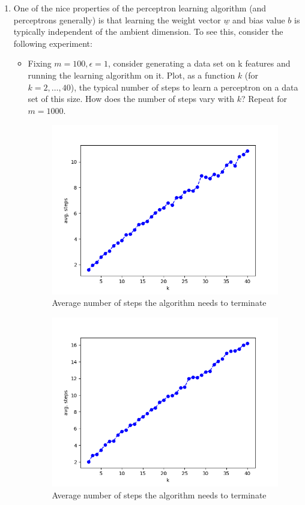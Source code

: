 \documentclass[letter, 12pt]{article}
\begin{document}
\begin{enumerate}
        
        \item {One of the nice properties of the perceptron learning algorithm (and perceptrons generally) is that learning
            the weight vector $ \underline{w} $ and bias value $ b $ is typically independent of the ambient dimension. To see this, consider
            the following experiment:}
        \begin{itemize}
            \item {Fixing $ m = 100, \epsilon = 1 $, consider generating a data set on k features and running the learning algorithm on
                it. Plot, as a function $ k $ (for $ k = 2, \dots , 40 $), the typical number of steps to learn a perceptron on a data
                set of this size. How does the number of steps vary with $ k $? Repeat for $ m = 1000 $.}
            \begin{figure}[H]
	            \centering
	            \includegraphics[width=.7\textwidth]{q4-100.png}
	            \caption{Average number of steps the algorithm needs to terminate}
        	\end{figure}
	        \begin{figure}[H]
		        \centering
		        \includegraphics[width=.7\textwidth]{q4-1000.png}
		        \caption{Average number of steps the algorithm needs to terminate}
		    \end{figure}
        \end{itemize}
        

\end{enumerate}
\end{document}

